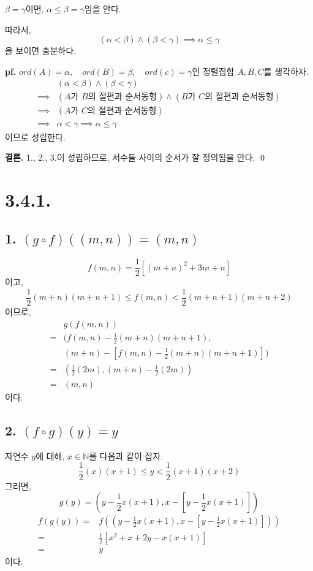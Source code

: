 \documentclass{article}
\begin{document}
$\beta = \gamma$이면, $\alpha \le \beta = \gamma$임을 안다.

따라서, $$(\alpha < \beta) \wedge (\beta < \gamma)  \implies \alpha \le \gamma$$을 보이면 충분하다.

\textbf{pf.}
$ord(A) = \alpha, \quad ord(B) = \beta, \quad ord(c) = \gamma$인 정렬집합 $A, B, C$를 생각하자.
\begin{align*}
&(\alpha < \beta) \wedge (\beta < \gamma) 
\\ \implies & (A\text{가 } B\text{의 절편과 순서동형}) \wedge (B\text{가 } C\text{의 절편과 순서동형})
\\ \implies & (A\text{가 } C\text{의 절편과 순서동형})
\\ \implies & \alpha < \gamma  \implies  \alpha \le \gamma
\end{align*}이므로 성립한다.

\textbf{결론.} 1., 2., 3.이 성립하므로, 서수들 사이의 순서가 잘 정의됨을 안다. \qed

\section{3.4.1.}
\subsection{1. $(g \circ f)((m, n)) = (m, n)$}
$$f(m, n) = \dfrac{1}{2} \left[ (m+n)^2 + 3m + n\right]$$
이고,
$$ \frac{1}{2}(m+n)(m+n+1) \le f(m, n) < \frac{1}{2}(m+n+1)(m+n+2) $$
이므로, 
\begin{align*}
&g(f(m, n))  
\\ =&\bigg( f(m, n) - \frac{1}{2} (m+n)(m+n+1), 
\\ &(m+n) - \left[ f(m, n) - \frac{1}{2}(m+n)(m+n+1)\right] \bigg)
\\ =&\left( \frac{1}{2}(2m), (m+n) - \frac{1}{2}(2m) \right)
\\ =&(m, n)
\end{align*}이다.
\subsection{2. $(f \circ g)(y) = y$}
자연수 $y$에 대해, $x \in \mathbb{N}$를 다음과 같이 잡자.
$$ \frac{1}{2}(x)(x+1) \le y < \frac{1}{2}(x+1)(x+2) $$
그러면,
$$g(y) = \left( y - \frac{1}{2}x(x+1), x-\left[y-\frac{1}{2}x(x+1)\right]\right)$$
\begin{align*}
f(g(y)) =& f\left(\left( y - \frac{1}{2}x(x+1), x-\left[y-\frac{1}{2}x(x+1)\right]\right)\right)
\\ =& \frac{1}{2}\left[x^2 + x + 2y - x(x+1)\right]
\\ =& y
\end{align*}이다.
\end{document}
